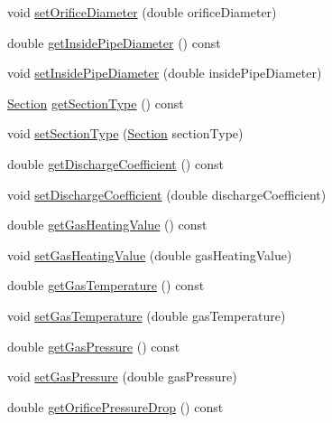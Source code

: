 \begin{DoxyCompactItemize}
void \hyperlink{class_flow_calculations_energy_use_a31116dc6381ad3fd9d2214da7ee3dd1b}{set\+Orifice\+Diameter} (double orifice\+Diameter)
\item 
double \hyperlink{class_flow_calculations_energy_use_a9042dce2938208358fe38ed8a726ca65}{get\+Inside\+Pipe\+Diameter} () const
\item 
void \hyperlink{class_flow_calculations_energy_use_a616486580460b616a7a8c4935119cd6c}{set\+Inside\+Pipe\+Diameter} (double inside\+Pipe\+Diameter)
\item 
\hyperlink{class_flow_calculations_energy_use_afbabab0da698748de91369a5dfc7662a}{Section} \hyperlink{class_flow_calculations_energy_use_ae88cc4f93028907c4c12e8925f63266b}{get\+Section\+Type} () const
\item 
void \hyperlink{class_flow_calculations_energy_use_add93257048914dbd920b6dc2be431b69}{set\+Section\+Type} (\hyperlink{class_flow_calculations_energy_use_afbabab0da698748de91369a5dfc7662a}{Section} section\+Type)
\item 
double \hyperlink{class_flow_calculations_energy_use_a28033765df3a220b5c7d75e34fd95c43}{get\+Discharge\+Coefficient} () const
\item 
void \hyperlink{class_flow_calculations_energy_use_aaa0b642f4cb22b3b74acd8a5d473a107}{set\+Discharge\+Coefficient} (double discharge\+Coefficient)
\item 
double \hyperlink{class_flow_calculations_energy_use_a42818c3f03cc70967eb6bb24094530a1}{get\+Gas\+Heating\+Value} () const
\item 
void \hyperlink{class_flow_calculations_energy_use_ae51a954fb1f44d6b114f66e69bdf754e}{set\+Gas\+Heating\+Value} (double gas\+Heating\+Value)
\item 
double \hyperlink{class_flow_calculations_energy_use_a9d5782d594530c0345ac3c8faff252b3}{get\+Gas\+Temperature} () const
\item 
void \hyperlink{class_flow_calculations_energy_use_a80db5465d8a0354da31a7f90c759ea1f}{set\+Gas\+Temperature} (double gas\+Temperature)
\item 
double \hyperlink{class_flow_calculations_energy_use_af98e97bce88915e6fdd7a0caf837049c}{get\+Gas\+Pressure} () const
\item 
void \hyperlink{class_flow_calculations_energy_use_a3b87a7c24340c618ed62ced5aece36b2}{set\+Gas\+Pressure} (double gas\+Pressure)
\item 
double \hyperlink{class_flow_calculations_energy_use_ac42e5918bba0c56406f39437317a2a87}{get\+Orifice\+Pressure\+Drop} () const
\item 

\end{DoxyCompactItemize}
